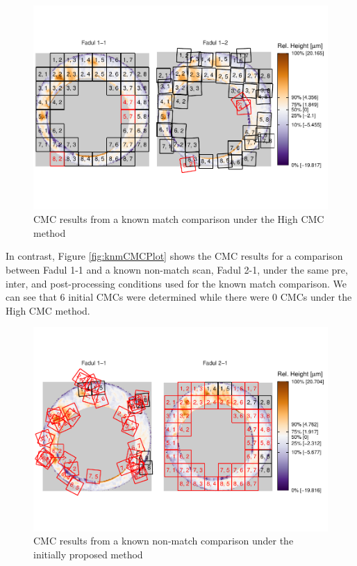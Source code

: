 \begin{Schunk}
\begin{figure}[htbp]

{\centering \includegraphics[width=1.2\textwidth,trim={0 2.5cm 0 2cm}]{cmcR_files/figure-latex/unnamed-chunk-15-1} 

}

\caption{\label{fig:highCMCPlot} CMC results from a known match comparison under the High CMC method}\label{fig:unnamed-chunk-15}
\end{figure}
\end{Schunk}

In contrast, Figure \ref{fig:knmCMCPlot} shows the CMC results for a
comparison between Fadul 1-1 and a known non-match scan, Fadul 2-1,
under the same pre, inter, and post-processing conditions used for the
known match comparison. We can see that 6 initial CMCs were determined
while there were 0 CMCs under the High CMC method.

\begin{Schunk}
\begin{figure}[htbp]

{\centering \includegraphics[width=1.2\textwidth,trim={0 2cm 0 1cm}]{cmcR_files/figure-latex/unnamed-chunk-16-1} 

}

\caption{\label{fig:knmCMCPlot} CMC results from a known non-match comparison under the initially proposed method}\label{fig:unnamed-chunk-16}
\end{figure}
\end{Schunk}


